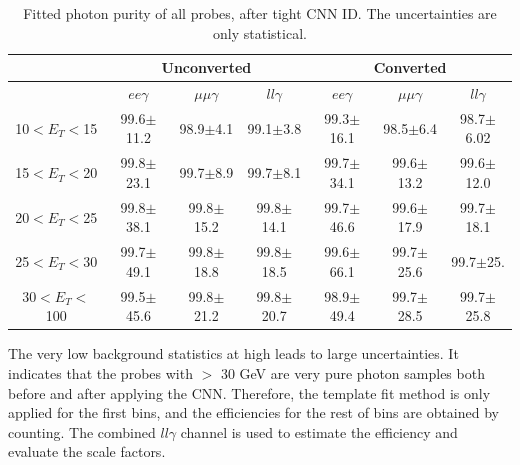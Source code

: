 \begin{table}[htbp]
\raggedleft
\begin{longtable}[c]{ccccccc}
\hline\hline
                             & \multicolumn{3}{c}{Unconverted}               & \multicolumn{3}{c}{Converted}                \\
                            \hline
\endfirsthead
%
\endhead
%
                             & $ee\gamma$           & $\mu\mu\gamma$           & $ll\gamma$           & $ee\gamma$           &  $\mu\mu\gamma$          & $ll\gamma$           \\
    \hline
10$<E_T<$15 & 99.6$\pm$11.2    & 98.9$\pm$4.1       & 99.1$\pm$3.8    & 99.3$\pm$16.1    & 98.5$\pm$6.4     & 98.7$\pm$6.02  \\
15$<E_T<$20 & 99.8$\pm$23.1    & 99.7$\pm$8.9       & 99.7$\pm$8.1    & 99.7$\pm$34.1    & 99.6$\pm$13.2    & 99.6$\pm$12.0 \\
20$<E_T<$25 & 99.8$\pm$38.1    & 99.8$\pm$15.2      & 99.8$\pm$14.1   & 99.7$\pm$46.6    & 99.6$\pm$17.9    & 99.7$\pm$18.1  \\
25$<E_T<$30  & 99.7$\pm$49.1   & 99.8$\pm$18.8      & 99.8$\pm$18.5   & 99.6$\pm$66.1    & 99.7$\pm$25.6    & 99.7$\pm$25.    \\
30$<E_T<$100 & 99.5$\pm$45.6   & 99.8$\pm$21.2      & 99.8$\pm$20.7   & 98.9$\pm$49.4    & 99.7$\pm$28.5    & 99.7$\pm$25.8     \\
\hline\hline
\end{longtable}
\begin{tcolorbox}[colback=black!5!white,colframe=white!75!black]
\caption{Fitted photon purity of all probes, after tight CNN ID. The uncertainties are only statistical.}
\label{tab:gamma:CNN:Zllg:Purity:A}
\end{tcolorbox}

\end{table}
The very low background statistics at high \pT leads to large uncertainties. It indicates that the probes with \pT$>$ 30 GeV are very pure photon samples both before and after applying the CNN. Therefore, the template fit method is only applied for the first \pT bins, and the efficiencies for the rest of bins are obtained by counting. The combined $ll\gamma$ channel is used to estimate the efficiency and evaluate the scale factors.   

